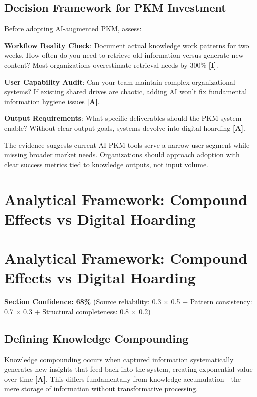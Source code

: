 \documentclass[a4paper,11pt]{article}
\newcommand{\ilabel}{\textbf{\textcolor{icolor}{[I]}}}
\newcommand{\alabel}{\textbf{\textcolor{acolor}{[A]}}}
\begin{document}
\subsection{Decision Framework for PKM Investment}

Before adopting AI-augmented PKM, assess:


\textbf{Workflow Reality Check}: Document actual knowledge work patterns for two weeks. How often do you need to retrieve old information versus generate new content? Most organizations overestimate retrieval needs by 300\% \ilabel{}.


\textbf{User Capability Audit}: Can your team maintain complex organizational systems? If existing shared drives are chaotic, adding AI won't fix fundamental information hygiene issues \alabel{}.


\textbf{Output Requirements}: What specific deliverables should the PKM system enable? Without clear output goals, systems devolve into digital hoarding \alabel{}.


The evidence suggests current AI-PKM tools serve a narrow user segment while missing broader market needs. Organizations should approach adoption with clear success metrics tied to knowledge outputs, not input volume.

\clearpage
\section{Analytical Framework: Compound Effects vs Digital Hoarding}

\section{Analytical Framework: Compound Effects vs Digital Hoarding}

\textbf{Section Confidence: 68\%} (Source reliability: 0.3 × 0.5 + Pattern consistency: 0.7 × 0.3 + Structural completeness: 0.8 × 0.2)


\subsection{Defining Knowledge Compounding}

Knowledge compounding occurs when captured information systematically generates new insights that feed back into the system, creating exponential value over time \alabel{}. This differs fundamentally from knowledge accumulation—the mere storage of information without transformative processing.
\end{document}
